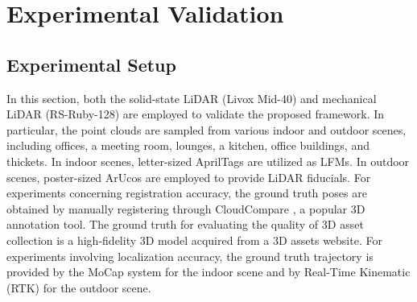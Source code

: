 \section{Experimental Validation} \label{5.7}

\subsection{Experimental Setup}
In this section, both the solid-state LiDAR (Livox Mid-40) and mechanical LiDAR (RS-Ruby-128) are employed to validate the proposed framework. In particular, the point clouds are sampled from various indoor and outdoor scenes, including offices, a meeting room, lounges, a kitchen, office buildings, and thickets. In indoor scenes, letter-sized AprilTags are utilized as LFMs. In outdoor scenes, poster-sized ArUcos are employed to provide LiDAR fiducials. For experiments concerning registration accuracy, the ground truth poses are obtained by manually registering through CloudCompare \cite{cloudcompare}, a popular 3D annotation tool. The ground truth for evaluating the quality of 3D asset collection is a high-fidelity 3D model acquired from a 3D assets website. For experiments involving localization accuracy, the ground truth trajectory is provided by the MoCap system for the indoor scene and by Real-Time Kinematic (RTK) for the outdoor scene.

